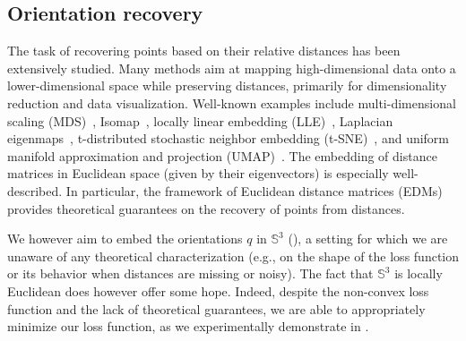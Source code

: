 \subsection{Orientation recovery}\label{sec:method:orientation-recovery}

The task of recovering points based on their relative distances has been extensively studied.
Many methods aim at mapping high-dimensional data onto a lower-dimensional space while preserving distances, primarily for dimensionality reduction and data visualization.
Well-known examples include multi-dimensional scaling (MDS)~\cite{cox2008mds}, Isomap~\cite{tenenbaum2000isomap}, locally linear embedding (LLE)~\cite{roweis2000lle}, Laplacian eigenmaps~\cite{belkin2003laplacian}, t-distributed stochastic neighbor embedding (t-SNE)~\cite{maaten2008tsne}, and uniform manifold approximation and projection (UMAP)~\cite{mcinnes2018umap}.
The embedding of distance matrices in Euclidean space (given by their eigenvectors) is especially well-described.
In particular, the framework of Euclidean distance matrices (EDMs)~\cite{dokmanic2015edm} provides theoretical guarantees on the recovery of points from distances.

We however aim to embed the orientations $q$ in $\mathbb{S}^3$ (), a setting for which we are unaware of any theoretical characterization (e.g., on the shape of the loss function or its behavior when distances are missing or noisy).
The fact that $\mathbb{S}^3$ is locally Euclidean does however offer some hope. %
Indeed, despite the non-convex loss function and the lack of theoretical guarantees, we are able to appropriately minimize our loss function, as we experimentally demonstrate in .

